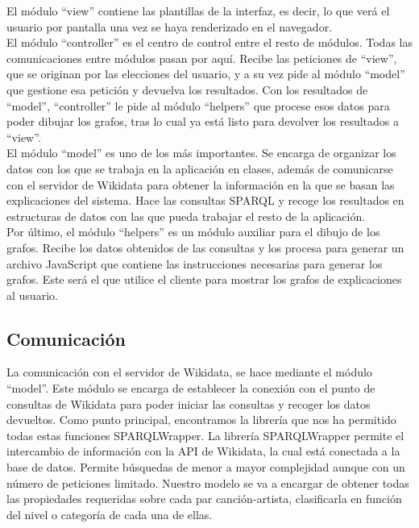El módulo ``view'' contiene las plantillas de la interfaz, es decir, lo que verá el usuario por pantalla una vez se haya renderizado en el navegador.\\

El módulo ``controller'' es el centro de control entre el resto de módulos. Todas las comunicaciones entre módulos pasan por aquí. Recibe las peticiones de ``view'', que se originan por las elecciones del usuario, y a su vez pide al módulo ``model'' que gestione esa petición y devuelva los resultados. Con los resultados de ``model'', ``controller'' le pide al módulo ``helpers'' que procese esos datos para poder dibujar los grafos, tras lo cual ya está listo para devolver los resultados a ``view''.\\

El módulo ``model'' es uno de los más importantes. Se encarga de organizar los datos con los que se trabaja en la aplicación en clases, además de comunicarse con el servidor de Wikidata para obtener la información en la que se basan las explicaciones del sistema. Hace las consultas SPARQL y recoge los resultados en estructuras de datos con las que pueda trabajar el resto de la aplicación.\\

Por último, el módulo ``helpers'' es un módulo auxiliar para el dibujo de los grafos. Recibe los datos obtenidos de las consultas y los procesa para generar un archivo JavaScript que contiene las instrucciones necesarias para generar los grafos. Este será el que utilice el cliente para mostrar los grafos de explicaciones al usuario.\\

\subsection{Comunicación}

La comunicación con el servidor de Wikidata, se hace mediante el módulo ``model''. Este módulo se encarga de establecer la conexión con el punto de consultas de Wikidata para poder iniciar las consultas y recoger los datos devueltos. Como punto principal, encontramos la librería que nos ha permitido todas estas funciones SPARQLWrapper. La librería SPARQLWrapper permite el intercambio de información con la API de Wikidata, la cual está conectada a la base de datos. Permite búsquedas de menor a mayor complejidad aunque con un número de peticiones limitado. Nuestro modelo se va a encargar de obtener todas las propiedades requeridas sobre cada par canción-artista, clasificarla en función del nivel o categoría de cada una de ellas.\\


